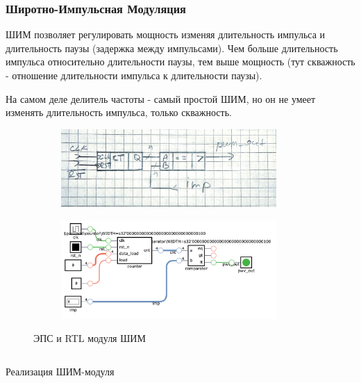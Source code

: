 \documentclass[a4paper]{article}
\begin{document}
  \subsubsection{Широтно-Импульсная Модуляция}

  ШИМ позволяет регулировать мощность изменяя длительность импульса и длительность паузы (задержка между импульсами).
  Чем больше длительность импульса относительно длительности паузы, тем выше мощность (тут скважность - отношение
  длительности импульса к длительности паузы).

  На самом деле делитель частоты - самый простой ШИМ, но он не умеет изменять длительность импульса, только скважность.

  \begin{figure}[H]
    \begin{subfigure}[b]{0.45\textwidth}
    \includegraphics[width=0.9\textwidth]{lab_313}
    \end{subfigure}
    \hfill
    \begin{subfigure}[b]{0.45\textwidth}
    \includegraphics[width=0.9\textwidth]{lab_314}
    \end{subfigure}
    \caption{ЭПС и RTL модуля ШИМ}
  \end{figure}

  \begin{listing}[H]
    \inputminted{verilog}{../chapter_6/pwm/pwm.v}
    \caption{Реализация ШИМ-модуля}
  \end{listing}
\end{document}
